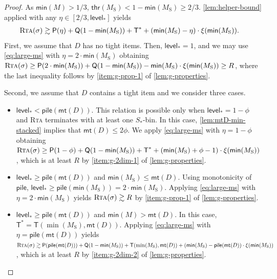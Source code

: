 \documentclass[a4paper,USenglish,cleveref]{lipics-v2019}
\newcommand{\R}{\ensuremath{R}}
\newcommand{\M}{\ensuremath{M_\mathrm{S}}\xspace}
\newcommand{\ST}{\ensuremath{S_*}\xspace}
\newcommand{\D}{\ensuremath{D}\xspace}
\newcommand{\smallBoundary}{\ensuremath{\phi}}
\newcommand{\g}{\ensuremath{\xi}}
\newcommand{\water}{\textsf{Q}}
\newcommand{\cutintegral}{\textsf{P}}
\newcommand{\thresh}{\textsf{thr}(\M)}
\newcommand{\stack}{\textsf{pile}}
\newcommand{\level}{\textsf{level}_*}
\newcommand{\mn}{\textsf{min}}
\newcommand{\mt}{\textsf{mt}(\D)}
\newcommand{\T}{\textsf{T}}
\newcommand{\Tmax}{\T^*}
\newcommand{\ALG}{\textsc{Rta}\xspace}
\begin{document}
\begin{proof}
As $\mn(M) > 1/3$, $\thresh < 1-\mn(\M) \geq 2/3$. 
\cref{lem:helper-bound} applied with any $\eta \in [2/3, \level]$ yields
\begin{align}
\label{eq:large-ms}
  \ALG(\sigma)
  & \gtrsim \cutintegral(\eta) + \water(1-\mn(\M)) + \Tmax + (\mn(\M) - \eta) \cdot \g(\mn(\M)).
\end{align}
%
First, we assume that $\D$ has no tight items.
Then, $\level = 1$, and we may use \eqref{eq:large-ms} with $\eta = 2 \cdot \mn(\M)$ obtaining
$\ALG(\sigma) \geq \cutintegral(2\cdot\mn(\M)) + \water(1-\mn(\M)) - \mn(\M) \cdot \g(\mn(\M)) \geq \R$,
where the last inequality follows by \cref{item:g-prop-1} of \cref{lem:g-properties}.

Second, we assume that $\D$ contains a tight item and we consider three cases.
%
\begin{itemize}
\item $\level < \stack(\mt)$. 
This relation is possible only when $\level = 1-\smallBoundary$ and \ALG terminates with at
least one $\ST$-bin. 
In this case, \cref{lem:mtD-min-stacked} implies that $\mt \leq 2\smallBoundary$. 
We apply \eqref{eq:large-ms} with $\eta = 1-\smallBoundary$ obtaining
$\ALG(\sigma) \geq \cutintegral(1-\smallBoundary) + \water(1-\mn(\M)) + \Tmax + (\mn(\M) + \smallBoundary - 1) \cdot \g(\mn(\M))$, which is at least $\R$ by \cref{item:g-2dim-1} of \cref{lem:g-properties}. 

\item $\level \geq \stack(\mt)$ and $\mn(\M) \leq \mt$.
Using monotonicity of $\stack$, $\level \geq \stack(\mn(\M)) =
2\cdot \mn(\M)$. 
Applying \eqref{eq:large-ms} with $\eta = 2\cdot \mn(\M)$ yields
$\ALG(\sigma) \gtrsim \R$ by \cref{item:g-prop-1} of \cref{lem:g-properties}.

\item $\level \geq \stack(\mt)$ and $\mn(M) > \mt$.
In this case, $\Tmax = \T(\min(\M), \mt)$. 
Applying \eqref{eq:large-ms} with $\eta = \stack(\mt)$ yields
$\ALG(\sigma) \gtrsim \cutintegral(\stack(\mt)) + \water(1-\mn(\M)) + \T(\min(\M), \mt) + (\mn(\M) -
\stack(\mt) \cdot \g(\mn(\M))$, which is at least $\R$
by \cref{item:g-2dim-2} of \cref{lem:g-properties}.
\qedhere
\end{itemize}
\end{proof}


\end{document}
